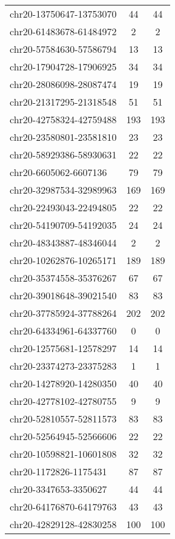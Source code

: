 \documentclass[10pt,letterpaper]{article}
\begin{document}
{\begin{longtable}{lSS}
	chr20-13750647-13753070 & 44     & 44       \\
	chr20-61483678-61484972 & 2      & 2        \\
	chr20-57584630-57586794 & 13     & 13       \\
	chr20-17904728-17906925 & 34     & 34       \\
	chr20-28086098-28087474 & 19     & 19       \\
	chr20-21317295-21318548 & 51     & 51       \\
	chr20-42758324-42759488 & 193    & 193      \\
	chr20-23580801-23581810 & 23     & 23       \\
	chr20-58929386-58930631 & 22     & 22       \\
	chr20-6605062-6607136   & 79     & 79       \\
	chr20-32987534-32989963 & 169    & 169      \\
	chr20-22493043-22494805 & 22     & 22       \\
	chr20-54190709-54192035 & 24     & 24       \\
	chr20-48343887-48346044 & 2      & 2        \\
	chr20-10262876-10265171 & 189    & 189      \\
	chr20-35374558-35376267 & 67     & 67       \\
	chr20-39018648-39021540 & 83     & 83       \\
	chr20-37785924-37788264 & 202    & 202      \\
	chr20-64334961-64337760 & 0      & 0        \\
	chr20-12575681-12578297 & 14     & 14       \\
	chr20-23374273-23375283 & 1      & 1        \\
	chr20-14278920-14280350 & 40     & 40       \\
	chr20-42778102-42780755 & 9      & 9        \\
	chr20-52810557-52811573 & 83     & 83       \\
	chr20-52564945-52566606 & 22     & 22       \\
	chr20-10598821-10601808 & 32     & 32       \\
	chr20-1172826-1175431   & 87     & 87       \\
	chr20-3347653-3350627   & 44     & 44       \\
	chr20-64176870-64179763 & 43     & 43       \\
	chr20-42829128-42830258 & 100    & 100      \\

\end{longtable}}
\end{document}
